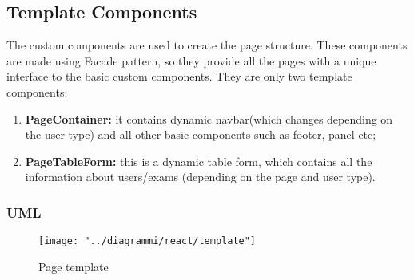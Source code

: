 \documentclass[../react]{subfiles}
\begin{document}
	\subsection{Template Components} The custom components are used to create the page structure. These components are made using Facade pattern, so 
	they provide all the pages with a unique interface to the basic custom components. They are only two template components: \begin{enumerate}
		\item \textbf{PageContainer: } it contains dynamic navbar(which changes depending on the user type) and all other basic components such as footer, panel etc;
		\item \textbf{PageTableForm: }this is a dynamic table form, which contains all the information about users/exams (depending on the page and user type).
	\end{enumerate} 
	\subsubsection{UML}
	\begin{figure}[h]
		\centering
		\texttt{[image: "../diagrammi/react/template"]}
		\caption{Page template}
		\label{fig:Page template}
	\end{figure}
	
\end{document}
